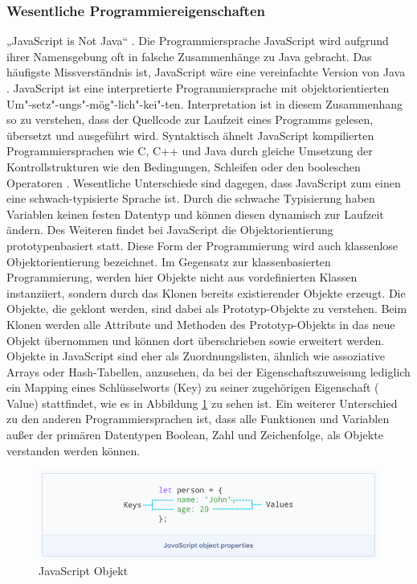 \subsubsection{Wesentliche Programmiereigenschaften}
„JavaScript is Not Java“  \cite{JS1.091}. Die Programmiersprache JavaScript wird aufgrund ihrer Namensgebung oft in falsche Zusammenhänge zu Java gebracht. Das häufigste Missverständnis ist, JavaScript wäre eine vereinfachte Version von Java \cite{JS1.091}.
\newline
\noindent
JavaScript ist eine interpretierte Programmiersprache mit objektorientierten Um"-setz"-ungs"-mög"-lich"-kei"-ten. Interpretation ist in diesem Zusammenhang so zu verstehen, dass der Quellcode zur Laufzeit eines Programms gelesen, übersetzt und ausgeführt wird.
Syntaktisch ähnelt JavaScript kompilierten Programmiersprachen wie C, C++ und Java durch gleiche Umsetzung der Kontrollstrukturen wie den Bedingungen, Schleifen oder den booleschen Operatoren \cite{JS1.1}.
Wesentliche Unterschiede sind dagegen, dass JavaScript zum einen eine schwach-typisierte Sprache ist.
Durch die schwache Typisierung haben Variablen keinen festen Datentyp und können diesen dynamisch zur Laufzeit ändern.
Des Weiteren findet bei JavaScript die Objektorientierung prototypenbasiert statt. Diese Form der Programmierung wird auch klassenlose Objektorientierung bezeichnet.
Im Gegensatz zur klassenbasierten Programmierung, werden hier Objekte nicht aus vordefinierten Klassen instanziiert, sondern durch das Klonen bereits existierender Objekte erzeugt.
Die Objekte, die geklont werden, sind dabei als Prototyp-Objekte zu ver\-steh\-en.
Beim Klonen werden alle Attribute und Methoden des Prototyp-Objekts in das neue Objekt übernommen und können dort überschrieben sowie erweitert werden.
Objekte in JavaScript sind eher als Zuordnungslisten, ähnlich wie assoziative Arrays oder Hash-Tabellen, anzusehen, da bei der Eigenschaftszuweisung lediglich ein Mapping eines Schlüsselworts (Key) zu seiner zugehörigen Eigenschaft ( Value) stattfindet, wie es in Abbildung \ref{fig:JavascriptObjekt} zu sehen ist.
\newline
\noindent
Ein weiterer Unterschied zu den anderen Programmiersprachen ist, dass alle Funktionen und Variablen außer der primären Datentypen Boolean, Zahl und Zeichenfolge, als Objekte verstanden werden können.\\

\begin{figure}[tbt]
\centering
\includegraphics[width=\textwidth]{images/JavaScript_Object.PNG}
\caption[JavaScript Objekt]{JavaScript Objekt \cite{JS1.29}}
\label{fig:JavascriptObjekt}
\end{figure}

